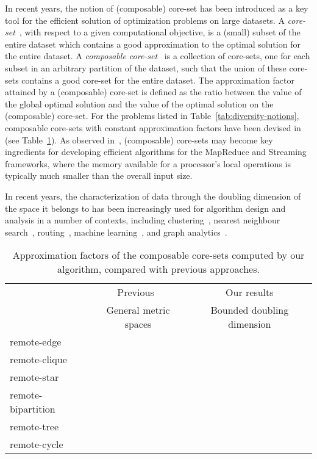 \documentclass{article}
\begin{document}
In recent years, the notion of (composable) core-set has been
introduced as a key tool for the efficient solution of optimization
problems on large datasets.  A \emph{core-set}~\cite{AgarwalHV05},
with respect to a given computational objective, is a (small) subset
of the entire dataset which contains a good approximation to the
optimal solution for the entire dataset. A \emph{composable
  core-set}~\cite{IndykMMM14} is a collection of core-sets, one for
each subset in an arbitrary partition of the dataset, such that the
union of these core-sets contains a good core-set for the entire
dataset. The approximation factor attained by a (composable) core-set
is defined as the ratio between the value of the global optimal
solution and the value of the optimal solution on the (composable)
core-set. For the problems listed in
Table~\ref{tab:diversity-notions}, composable core-sets with constant
approximation factors have been devised in
\cite{IndykMMM14,AghamolaeiFZ15} (see
Table~\ref{tab:core-set-approximations}).  As observed
in~\cite{IndykMMM14}, (composable) core-sets may become key
ingredients for developing efficient algorithms for the MapReduce and
Streaming frameworks, where the memory available for a processor's
local operations is typically much smaller than the overall input
size.

In recent years, the characterization of data through the doubling
dimension of the space it belongs to has been increasingly used for
algorithm design and analysis in a number of contexts, including
clustering~\cite{AckermannBS10}, nearest neighbour
search~\cite{ColeL06}, routing~\cite{KonjevodRX08}, machine
learning~\cite{GottliebKK14}, and graph
analytics~\cite{CeccarelloPPU15, CeccarelloPPU16}.


\begin{table}
  \centering
  \begin{tabular}{lcc}\toprule
     & Previous~\cite{IndykMMM14,AghamolaeiFZ15}
     & Our results
    \\
     & {\footnotesize General metric spaces}
     & {\footnotesize Bounded doubling dimension}
    \\
    \midrule
    remote-edge
     & 
     & 
    \\
    remote-clique
&  
     & 
    \\
    remote-star
     &  
     & 
    \\
    remote-bipartition
     & 
     & 
    \\
    remote-tree
     &  
     & 
    \\
    remote-cycle
     &  
     & 
    \\
    \bottomrule
  \end{tabular}
  \caption{Approximation factors of the composable core-sets computed by our algorithm,
    compared with previous approaches.}\label{tab:core-set-approximations}
\end{table}
\end{document}

